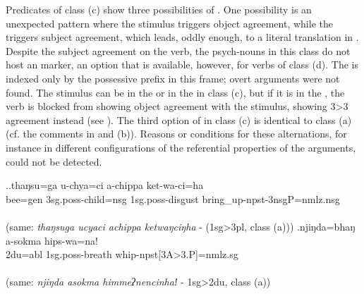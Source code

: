 Predicates of class (c) show three possibilities of . One possibility is an unexpected pattern where the stimulus triggers object agreement, while the  triggers subject agreement, which leads, oddly enough, to  a literal translation  in \Next[a]. Despite the subject agreement on the verb, the  psych-nouns in this class do not host an   marker,  an option that is available, however, for verbs of class (d). The  is indexed only  by the possessive prefix in this frame; overt  arguments were not found. The stimulus can be in the  or in the  in class (c), but if it is in the , the verb is blocked from showing object agreement with the stimulus, showing 3>3 agreement instead (see \Next[b]). The third option of  in class (c) is identical to class (a) (cf. the comments in \Next[a] and (b)). Reasons or conditions for these alternations, for instance  in different  configurations of the referential properties of the arguments, could not be detected. 

\ex.\ag.thaŋsu=ga u-chya=ci a-chippa ket-wa-ci=ha\\
bee{\sc =gen} {\sc 3sg.poss-}child{\sc =nsg} {\sc 1sg.poss-}disgust bring\_up{\sc -npst-3nsgP=nmlz.nsg}\\
 \\
(same: \emph{thaŋsuga ucyaci achippa ketwaŋciŋha} - (1{\sc sg}>3{\sc pl}, class (a)))
\bg.njiŋda=bhaŋ a-sokma hips-wa=na!\\
{\sc 2du=abl} {\sc 1sg.poss-}breath whip-{\sc npst[3A>3.P]=nmlz.sg}\\
 \\
(same: \emph{njiŋda asokma himmeʔnencinhaǃ} - 1{\sc sg}>2{\sc du}, class (a))


